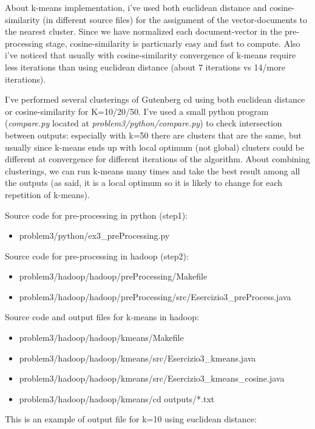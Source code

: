 \documentclass{article}
\begin{document}
About k-means implementation, i've used both euclidean distance and cosine-similarity (in different source files) for the assignment of the vector-documents to the nearest cluster. Since we have normalized each document-vector in the pre-processing stage, cosine-similarity is particuarly easy and fast to compute. Also i've noticed that usually with cosine-similarity convergence of k-means require less iterations than using euclidean distance (about 7 iterations vs 14/more iterations).

I've performed several clusterings of Gutenberg cd using both euclidean distance or cosine-similarity for K=10/20/50. I've used a small python program (\textit{compare.py} located at \textit{problem3/python/compare.py}) to check intersection between outputs: especially with k=50 there are clusters that are the same, but usually since k-means ends up with local optimum (not global) clusters could be different at convergence for different iterations of the algorithm.
About combining clusterings, we can run k-means many times and take the best result among all the outputs (as said, it is a local optimum so it is likely to change for each repetition of k-means).

Source code for pre-processing in python (step1):
\begin {itemize}
    \item problem3/python/ex3\_preProcessing.py
\end {itemize}

Source code for pre-processing in hadoop (step2):
\begin {itemize}
    \item problem3/hadoop/hadoop/preProcessing/Makefile
    \item problem3/hadoop/hadoop/preProcessing/src/Esercizio3\_preProcess.java
\end {itemize}

Source code and output files for k-means in hadoop:
\begin {itemize}
    \item problem3/hadoop/hadoop/kmeans/Makefile
    \item problem3/hadoop/hadoop/kmeans/src/Esercizio3\_kmeans.java
    \item problem3/hadoop/hadoop/kmeans/src/Esercizio3\_kmeans\_cosine.java
    \item problem3/hadoop/hadoop/kmeans/cd outputs/*.txt
\end {itemize}

This is an example of output file for k=10 using euclidean distance:
\end{document}

